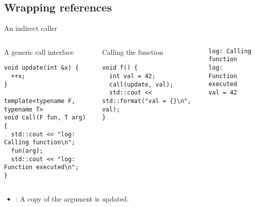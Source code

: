 \subsection{Wrapping references}

\begin{frame}[t,fragile]{An indirect caller}

\begin{columns}[T]

\begin{block}{A generic call interface}
\begin{lstlisting}
void update(int &x) {
  ++x;
}

template<typename F, typename T>
void call(F fun, T arg) {
  std::cout << "log: Calling function\n";
  fun(arg);
  std::cout << "log: Function executed\n";
}
\end{lstlisting}
\end{block}

\pause
{}
\begin{block}{Calling the function}
\begin{lstlisting}
void f() {
  int val = 42;
  call(update, val);
  std::cout << std::format("val = {}\n", val);
}
\end{lstlisting}
\end{block}

\pause
\begin{lstlisting}[style=terminal]
log: Calling function
log: Function executed
val = 42
\end{lstlisting}

\end{columns}

\begin{itemize}
  \item {}: A copy of the argument is updated. 
\end{itemize}
\end{frame}


